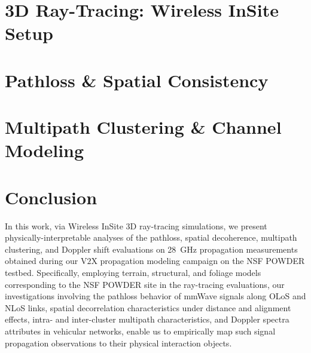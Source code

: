 \documentclass[10pt, twocolumn]{IEEEtran}
\begin{document}
\section{3D Ray-Tracing: Wireless InSite Setup}\label{S3}

\section{Pathloss \& Spatial Consistency}\label{S4}

\section{Multipath Clustering \& Channel Modeling}\label{S5}

\balance
\section{Conclusion}\label{S6}
In this work, via Wireless InSite $3$D ray-tracing simulations, we present physically-interpretable analyses of the pathloss, spatial decoherence, multipath clustering, and Doppler shift evaluations on \SI{28}{\giga\hertz} propagation measurements obtained during our V$2$X propagation modeling campaign on the NSF POWDER testbed. Specifically, employing terrain, structural, and foliage models corresponding to the NSF POWDER site in the ray-tracing evaluations, our investigations involving the pathloss behavior of mmWave signals along OLoS and NLoS links, spatial decorrelation characteristics under distance and alignment effects, intra- and inter-cluster multipath characteristics, and Doppler spectra attributes in vehicular networks, enable us to empirically map such signal propagation observations to their physical interaction objects.
\vspace{-3mm}

\balance

 
\end{document}
